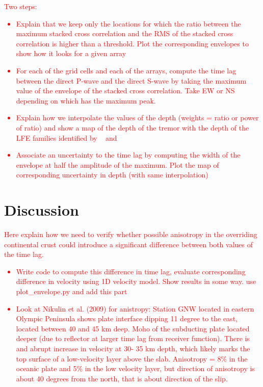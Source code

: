 \documentclass[draft]{agujournal2019}
\begin{document}
\textcolor{red}{Two steps:
\begin{itemize}
\item Explain that we keep only the locations for which the ratio between the maximum stacked cross correlation and the RMS of the stacked cross correlation is higher than a threshold. Plot the corresponding envelopes to show how it looks for a given array
\item For each of the grid cells and each of the arrays, compute the time lag between the direct P-wave and the direct S-wave by taking the maximum value of the envelope of the stacked cross correlation. Take EW or NS depending on which has the maximum peak.
\item Explain how we interpolate the values of the depth (weights = ratio or power of ratio) and show a map of the depth of the tremor with the depth of the LFE families identified by ~\cite{SWE_2019} and ~\cite{CHE_2017_JGR, CHE_2017_G3}
\item Associate an uncertainty to the time lag by computing the width of the envelope at half the amplitude of the maximum. Plot the map of corresponding uncertainty in depth (with same interpolation)
\end{itemize}
}

\section{Discussion}

\textcolor{red}{Here explain how we need to verify whether possible anisotropy in the overriding continental crust could introduce a significant difference between both values of the time lag.
\begin{itemize}
\item Write code to compute this difference in time lag, evaluate corresponding difference in velocity using 1D velocity model. Show results in some way. use plot\_envelope.py and add this part
\item Look at Nikulin et al. (2009) for anistropy: Station GNW located in eastern Olympic Peninsula shows plate interface dipping 11 degree to the east, located between 40 and 45 km deep. Moho of the subducting plate located deeper (due to reflector at larger time lag from receiver function). There is and abrupt increase in velocity at 30- 35 km depth, which likely marks the top surface of a low-velocity layer above the slab. Anisotropy = 8\% in the oceanic plate and 5\% in the low velocity layer, but direction of anisotropy is about 40 degrees from the north, that is about direction of the slip.
\end{itemize}
}
\end{document}
